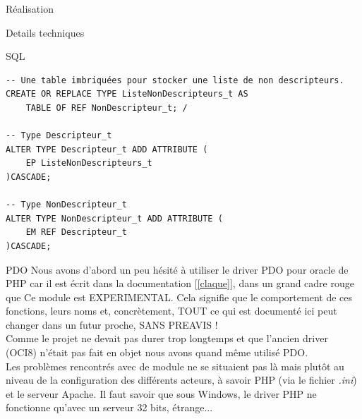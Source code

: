 \documentclass[a4paper, 12pt]{report}
\begin{document}
\begin{chapter}{Réalisation}
\begin{section}{Details techniques}
\begin{subsection}{SQL}
\begin{verbatim}
-- Une table imbriquées pour stocker une liste de non descripteurs.
CREATE OR REPLACE TYPE ListeNonDescripteurs_t AS 
    TABLE OF REF NonDescripteur_t; /

-- Type Descripteur_t
ALTER TYPE Descripteur_t ADD ATTRIBUTE (
    EP ListeNonDescripteurs_t
)CASCADE;

-- Type NonDescripteur_t
ALTER TYPE NonDescripteur_t ADD ATTRIBUTE (
    EM REF Descripteur_t
)CASCADE;
			\end{verbatim}
		\end{subsection}

		\begin{subsection}{PDO}	
			Nous avons d'abord un peu hésité à utiliser le driver PDO pour oracle de PHP car il est écrit dans la documentation [\ref{claque}], 
			dans un grand cadre rouge que \og Ce module est EXPERIMENTAL. Cela signifie que le comportement de ces fonctions, leurs noms et, concrètement, TOUT ce qui est documenté ici peut changer dans un futur proche, SANS PREAVIS ! \fg \\
			Comme le projet ne devait pas durer trop longtemps et que l'ancien driver (OCI8) n'était pas fait en objet nous avons quand même utilisé PDO.\\

			Les problèmes rencontrés avec de module ne se situaient pas là mais plutôt au niveau de la configuration des 
			différents acteurs, à savoir PHP (via le fichier \emph{.ini}) et le serveur Apache. Il faut savoir que sous
			Windows, le driver PHP ne fonctionne qu'avec un serveur 32 bits, étrange...
		\end{subsection}
	\end{section}
\end{chapter}
\end{document}
